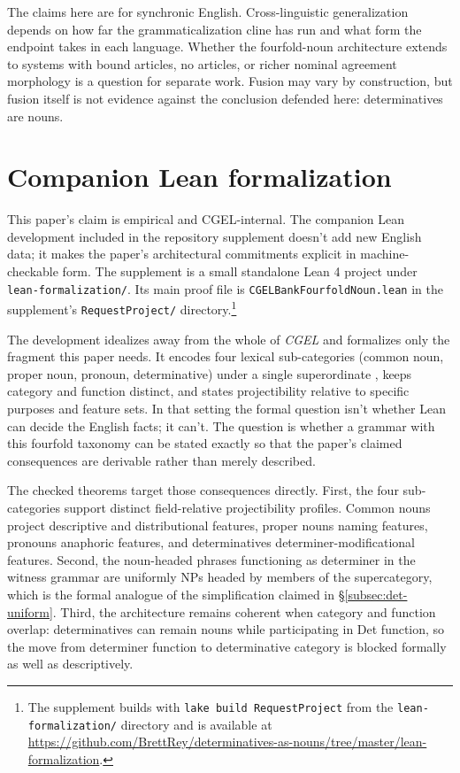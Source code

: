 \documentclass[12pt]{article}
\begin{document}
The claims here are for synchronic English. Cross-linguistic generalization depends on how far the grammaticalization cline has run and what form the endpoint takes in each language. Whether the fourfold-noun architecture extends to systems with bound articles, no articles, or richer nominal agreement morphology is a question for separate work. Fusion may vary by construction, but fusion itself is not evidence against the conclusion defended here: determinatives are nouns.

\newpage
\appendix

\section{Companion Lean formalization}\label{sec:lean-appendix}

This paper's claim is empirical and CGEL-internal. The companion Lean development included in the repository supplement doesn't add new English data; it makes the paper's architectural commitments explicit in machine-checkable form. The supplement is a small standalone Lean 4 project under \texttt{lean-formalization/}. Its main proof file is \texttt{CGELBankFourfoldNoun.lean} in the supplement's \texttt{RequestProject/} directory.\footnote{The supplement builds with \texttt{lake build RequestProject} from the \texttt{lean-formalization/} directory and is available at \url{https://github.com/BrettRey/determinatives-as-nouns/tree/master/lean-formalization}.}

The development idealizes away from the whole of \textit{CGEL} and formalizes only the fragment this paper needs. It encodes four lexical sub-categories (common noun, proper noun, pronoun, determinative) under a single superordinate , keeps category and function distinct, and states projectibility relative to specific purposes and feature sets. In that setting the formal question isn't whether Lean can decide the English facts; it can't. The question is whether a grammar with this fourfold taxonomy can be stated exactly so that the paper's claimed consequences are derivable rather than merely described.

The checked theorems target those consequences directly. First, the four sub-categories support distinct field-relative projectibility profiles. Common nouns project descriptive and distributional features, proper nouns naming features, pronouns anaphoric features, and determinatives determiner-modificational features. Second, the noun-headed phrases functioning as determiner in the witness grammar are uniformly NPs headed by members of the  supercategory, which is the formal analogue of the simplification claimed in §\ref{subsec:det-uniform}. Third, the architecture remains coherent when category and function overlap: determinatives can remain nouns while participating in Det function, so the move from determiner function to determinative category is blocked formally as well as descriptively.
\end{document}
